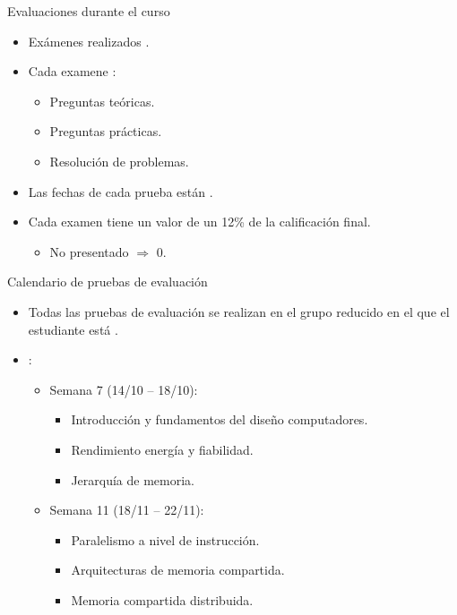 \begin{frame}[t]{Evaluaciones durante el curso}
\begin{itemize}
  \item Exámenes realizados .

  \item Cada examene :
    \begin{itemize}
      \item Preguntas teóricas.
      \item Preguntas prácticas.
      \item Resolución de problemas.
    \end{itemize}

  \item Las fechas de cada prueba están .

  \item Cada examen tiene un valor de un 12\% de la calificación final.
    \begin{itemize}
      \item No presentado $\Rightarrow$ 0.
    \end{itemize}
\end{itemize}
\end{frame}

\begin{frame}[t]{Calendario de pruebas de evaluación}
\begin{itemize}
  \item Todas las pruebas de evaluación se realizan en el grupo reducido
        en el que el estudiante está .

  \vfill
  \item {}:
  \begin{itemize}
    \item Semana 7 (14/10 -- 18/10): 
      \begin{itemize}
        \item Introducción y fundamentos del diseño computadores.
        \item Rendimiento energía y fiabilidad.
        \item Jerarquía de memoria.
      \end{itemize}

    \item Semana 11 (18/11 -- 22/11):
      \begin{itemize}
        \item Paralelismo a nivel de instrucción.
        \item Arquitecturas de memoria compartida.
        \item Memoria compartida distribuida.
      \end{itemize}
  \end{itemize}
\end{itemize}
\end{frame}


